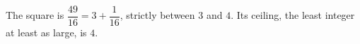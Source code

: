 The square is $\dfrac{49}{16}=3+\dfrac{1}{16}$, strictly between $3$ and $4$. Its ceiling, the least integer at least as large, is $\boxed4$.
